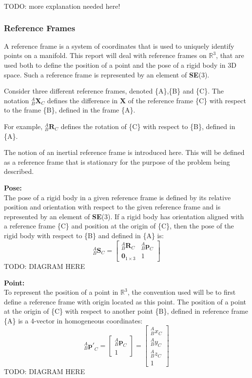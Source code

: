 		TODO: more explanation needed here!
		
	\subsubsection{Reference Frames}
		A reference frame is a system of coordinates that is used to uniquely identify points on a manifold. This report will deal with reference frames on $\mathbb{R}^3$, that are used both to define the position of a point and the pose of a rigid body in 3D space.
		Such a reference frame is represented by an element of \textbf{SE}(3).
		
		Consider three different reference frames, denoted \{A\},\{B\} and \{C\}.
		The notation $^{A}_{B}\mathbf{X}^{}_{C}$ defines the difference in $\mathbf{X}$ of the reference frame \{C\} with respect to the frame \{B\}, defined in the frame \{A\}.
		
		For example, $^{A}_{B}\mathbf{R}^{}_{C}$ defines the rotation of \{C\} with respect to \{B\}, defined in \{A\}.
		
		The notion of an inertial reference frame is introduced here. This will be defined as a reference frame that is stationary for the purpose of the problem being described. 
		
		\textbf{Pose:}\\
		The pose of a rigid body in a given reference frame is defined by its relative position and orientation with respect to the given reference frame and is represented by an element of \textbf{SE}(3). If a rigid body has orientation aligned with a reference frame \{C\} and position at the origin of \{C\}, then the pose of the rigid body with respect to \{B\} and defined in \{A\} is:
		\begin{equation}
			{^{A}_{B}\mathbf{S}^{}_{C}} = 
			\begin{bmatrix}
				^{A}_{B}\mathbf{R}^{}_{C}	& 	^{A}_{B}\mathbf{p}^{}_{C}\\
				\textbf{0}_{1 \times 3} & 1						  
			\end{bmatrix}
		\end{equation}		
		TODO: DIAGRAM HERE
		
		\textbf{Point:}\\
		To represent the position of a point in $\mathbb{R}^3$, the convention used will be to first define a reference frame with origin located as this point. The position of a point at the origin of \{C\} with respect to another point \{B\}, defined in reference frame \{A\} is a 4-vector in homogeneous coordinates:
		\begin{equation}
			{^{A}_{B}\mathbf{p'}^{}_{C}} = 
			\begin{bmatrix}
				{^{A}_{B}\mathbf{p}^{}_{C}} \\
				1
			\end{bmatrix} = 
			\begin{bmatrix}
				{^{A}_{B}x^{}_{C}} \\
				{^{A}_{B}y^{}_{C}} \\
				{^{A}_{B}z^{}_{C}} \\
				1
			\end{bmatrix}
		\end{equation}
		TODO: DIAGRAM HERE
		
